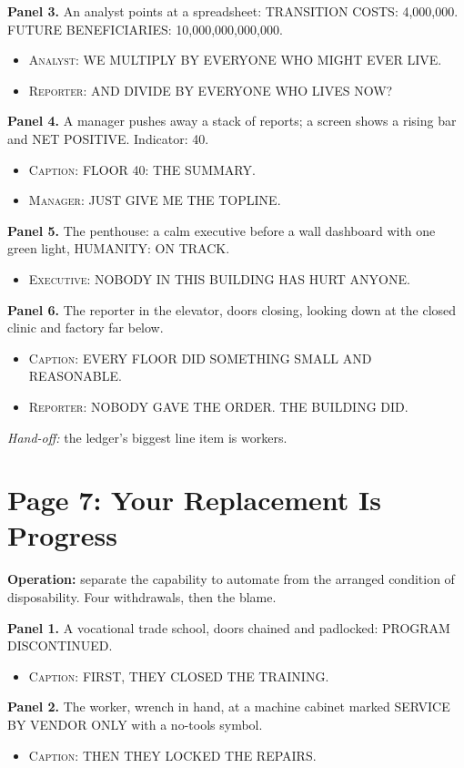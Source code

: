 \documentclass[11pt]{article}
\newcommand{\op}[1]{\textbf{Operation:} #1\par}
\newcommand{\panel}[2]{\textbf{#1.} #2\par}
\newenvironment{lines}{\begin{itemize}[label={},leftmargin=1.5em,itemsep=0.05em,topsep=0.1em]}{\end{itemize}}
\newcommand{\say}[2]{\item \textsc{#1}: \textsf{\small #2}}
\newcommand{\handoff}[1]{\emph{Hand-off:} #1\par}
\begin{document}
\panel{Panel 3}{An analyst points at a spreadsheet: \textsf{\small TRANSITION COSTS: 4,000,000}. \textsf{\small FUTURE BENEFICIARIES: 10,000,000,000,000}.}
\begin{lines}\say{Analyst}{WE MULTIPLY BY EVERYONE WHO MIGHT EVER LIVE.}\say{Reporter}{AND DIVIDE BY EVERYONE WHO LIVES NOW?}\end{lines}

\panel{Panel 4}{A manager pushes away a stack of reports; a screen shows a rising bar and \textsf{\small NET POSITIVE}. Indicator: 40.}
\begin{lines}\say{Caption}{FLOOR 40: THE SUMMARY.}\say{Manager}{JUST GIVE ME THE TOPLINE.}\end{lines}

\panel{Panel 5}{The penthouse: a calm executive before a wall dashboard with one green light, \textsf{\small HUMANITY: ON TRACK}.}
\begin{lines}\say{Executive}{NOBODY IN THIS BUILDING HAS HURT ANYONE.}\end{lines}

\panel{Panel 6}{The reporter in the elevator, doors closing, looking down at the closed clinic and factory far below.}
\begin{lines}\say{Caption}{EVERY FLOOR DID SOMETHING SMALL AND REASONABLE.}\say{Reporter}{NOBODY GAVE THE ORDER. THE BUILDING DID.}\end{lines}

\handoff{the ledger's biggest line item is workers.}

\section{Page 7: Your Replacement Is Progress}

\op{separate the capability to automate from the arranged condition of disposability. Four withdrawals, then the blame.}

\panel{Panel 1}{A vocational trade school, doors chained and padlocked: \textsf{\small PROGRAM DISCONTINUED}.}
\begin{lines}\say{Caption}{FIRST, THEY CLOSED THE TRAINING.}\end{lines}

\panel{Panel 2}{The worker, wrench in hand, at a machine cabinet marked \textsf{\small SERVICE BY VENDOR ONLY} with a no-tools symbol.}
\begin{lines}\say{Caption}{THEN THEY LOCKED THE REPAIRS.}\end{lines}
\end{document}
